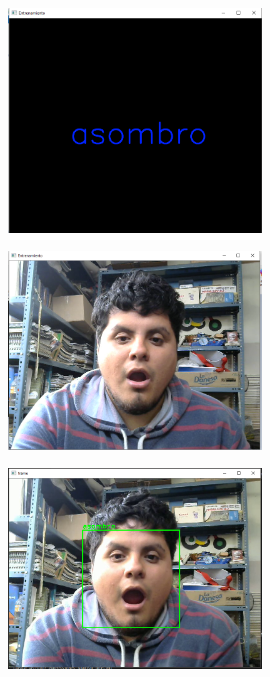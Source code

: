 \begin{figure}[ht]
\begin{center}
\includegraphics[width=0.6\textwidth]{Imagen33}
\end{center}
\end{figure}

\begin{figure}[ht]
\begin{center}
\includegraphics[width=0.6\textwidth]{Imagen34}
\end{center}
\end{figure}

\begin{figure}[ht]
\begin{center}
\includegraphics[width=0.6\textwidth]{Imagen35}
\end{center}
\end{figure}

